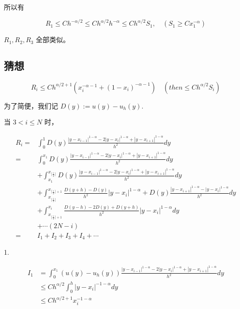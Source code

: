 \documentclass{ctexart}
\begin{document}
所以有

\begin{equation}
    R_1 \le C h^{-\alpha/2} \le C h^{\alpha/2} h^{-\alpha} \le C h^{\alpha/2} S_1, \quad (S_1\ge C x_1^{-\alpha})
\end{equation}


\(R_1, R_2, R_3\) 全部类似。

\subsection{猜想}

\begin{equation}
    R_i \le C h^{\alpha/2+1} (x_i^{-\alpha-1} + (1-x_i)^{-\alpha-1}) \quad (then \le C h^{\alpha/2} S_i)
\end{equation}

为了简便，我们记 \(D(y) := u(y) - u_h(y)\).

当 \(3<i\le N\) 时，

\begin{equation}
    \begin{aligned}
        R_i = &\int_0^1 D(y) \frac{ |y-x_{i-1}|^{1-\alpha} - 2|y-x_i |^{1-\alpha} + |y-x_{i+1}|^{1-\alpha} }{h^2} dy    \\
        = &\int_0^{x_1} D(y) \frac{ |y-x_{i-1}|^{1-\alpha} - 2|y-x_i |^{1-\alpha} + |y-x_{i+1}|^{1-\alpha} }{h^2} dy \\
        & + \int_{x_1}^{x_{\lceil \frac{i}{2}\rceil}} D(y) \frac{ |y-x_{i-1}|^{1-\alpha} - 2|y-x_i |^{1-\alpha} + |y-x_{i+1}|^{1-\alpha} }{h^2} dy \\
        &+ \int_{x_{\lceil \frac{i}{2}\rceil }}^{x_{\lceil \frac{i}{2}\rceil +1 }} \frac{  D(y+h) - D(y) }{h^2} |y-x_i|^{1-\alpha}  + D(y)\frac{ |y-x_{i+1}|^{1-\alpha} - |y-x_{i}|^{1-\alpha} }{h^2} dy\\
        & + \int_{x_{\lceil \frac{i}{2}\rceil +1}}^{x_{i}} \frac{  D(y-h) -2D(y) +  D(y+h) }{h^2} |y-x_i|^{1-\alpha} dy  \\
        & + \cdots (2N-i)     \\
        = & I_1 + I_2 + I_3 + I_4 + \cdots
    \end{aligned}
\end{equation}

1. 

\begin{equation}
    \begin{aligned}
        I_1 &= \int_0^{x_1} (u(y) - u_h(y)) \frac{ |y-x_{i-1}|^{1-\alpha} - 2|y-x_i |^{1-\alpha} + |y-x_{i+1}|^{1-\alpha} }{h^2} dy     \\
        &\le C h^{\alpha/2} \int_0^{h} |y-x_i|^{-1-\alpha} dy   \\
        &\le C h^{\alpha/2 + 1} x_{i}^{-1-\alpha}       \\
    \end{aligned}
\end{equation}
\end{document}
